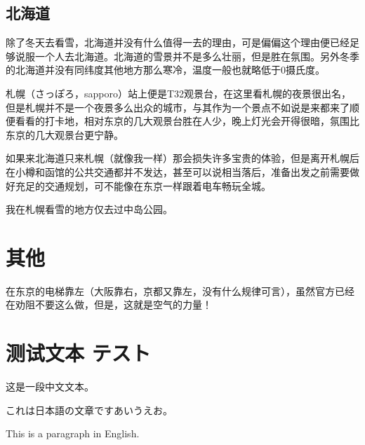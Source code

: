 \documentclass{article}
\newcommand{\jp}[1]{{\japanesefont #1}}
\begin{document}
\subsection{北海道}
除了冬天去看雪，北海道并没有什么值得一去的理由，可是偏偏这个理由便已经足够说服一个人去北海道。北海道的雪景并不是多么壮丽，但是胜在氛围。另外冬季的北海道并没有同纬度其他地方那么寒冷，温度一般也就略低于0摄氏度。\par
札幌（さっぽろ，sapporo）站上便是T32观景台，在这里看札幌的夜景很出名，但是札幌并不是一个夜景多么出众的城市，与其作为一个景点不如说是来都来了顺便看看的打卡地，相对东京的几大观景台胜在人少，晚上灯光会开得很暗，氛围比东京的几大观景台更宁静。\par
如果来北海道只来札幌（就像我一样）那会损失许多宝贵的体验，但是离开札幌后在小樽和函馆的公共交通都并不发达，甚至可以说相当落后，准备出发之前需要做好充足的交通规划，可不能像在东京一样跟着电车畅玩全城。\par
我在札幌看雪的地方仅去过中岛公园。

\section{其他}
在东京的电梯靠左（大阪靠右，京都又靠左，没有什么规律可言），虽然官方已经在劝阻不要这么做，但是，这就是空气的力量！

\section*{测试文本 テスト}
这是一段中文文本。\par
\jp{これは日本語の文章です}あいうえお。\par
This is a paragraph in English.
\end{document}
